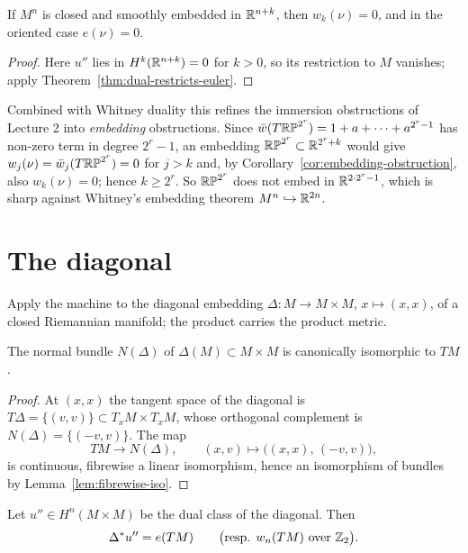 \begin{corollary}\label{cor:embedding-obstruction}
If $M^n$ is closed and smoothly embedded in $\mathbb{R}^{n+k}$, then $w_k(\nu)=0$, and
in the oriented case $e(\nu)=0$.
\end{corollary}

\begin{proof}
Here $u''$ lies in $H^k(\mathbb{R}^{n+k})=0$ for $k>0$, so its restriction to $M$
vanishes; apply Theorem~\ref{thm:dual-restricts-euler}.
\end{proof}

\begin{example}
Combined with Whitney duality this refines the immersion obstructions of
Lecture 2 into \emph{embedding} obstructions. Since
$\bar w(T\mathbb{RP}^{2^r})=1+a+\dots+a^{2^r-1}$ has non-zero term in degree $2^r-1$,
an embedding $\mathbb{RP}^{2^r}\subset\mathbb{R}^{2^r+k}$ would give
$w_j(\nu)=\bar w_j(T\mathbb{RP}^{2^r})=0$ for $j>k$ and, by
Corollary~\ref{cor:embedding-obstruction}, also $w_k(\nu)=0$; hence
$k\ge 2^r$. So $\mathbb{RP}^{2^r}$ does not embed in $\mathbb{R}^{2\cdot2^r-1}$, which is sharp
against Whitney's embedding theorem $M^n\hookrightarrow\mathbb{R}^{2n}$.
\end{example}

\section{The diagonal}

Apply the machine to the diagonal embedding
$\Delta\colon M\to M\times M$, $x\mapsto(x,x)$, of a closed Riemannian manifold;
the product carries the product metric.

\begin{lemma}\label{lem:normal-diagonal}
The normal bundle $N(\Delta)$ of $\Delta(M)\subset M\times M$ is canonically
isomorphic to $TM$.
\end{lemma}

\begin{proof}
At $(x,x)$ the tangent space of the diagonal is
$T\Delta=\{(v,v)\}\subset T_xM\times T_xM$, whose orthogonal complement is
$N(\Delta)=\{(-v,v)\}$. The map
\[
TM\longrightarrow N(\Delta),
\qquad
(x,v)\longmapsto\big((x,x),\,(-v,v)\big),
\]
is continuous, fibrewise a linear isomorphism, hence an isomorphism of bundles
by Lemma~\ref{lem:fibrewise-iso}.
\end{proof}

\begin{corollary}\label{cor:diagonal-euler}
Let $u''\in H^n(M\times M)$ be the dual class of the diagonal. Then
\[
\Delta^*u''=e(TM)
\qquad\big(\text{resp. } w_n(TM)\ \text{over }\mathbb{Z}_2\big).
\]
\end{corollary}

